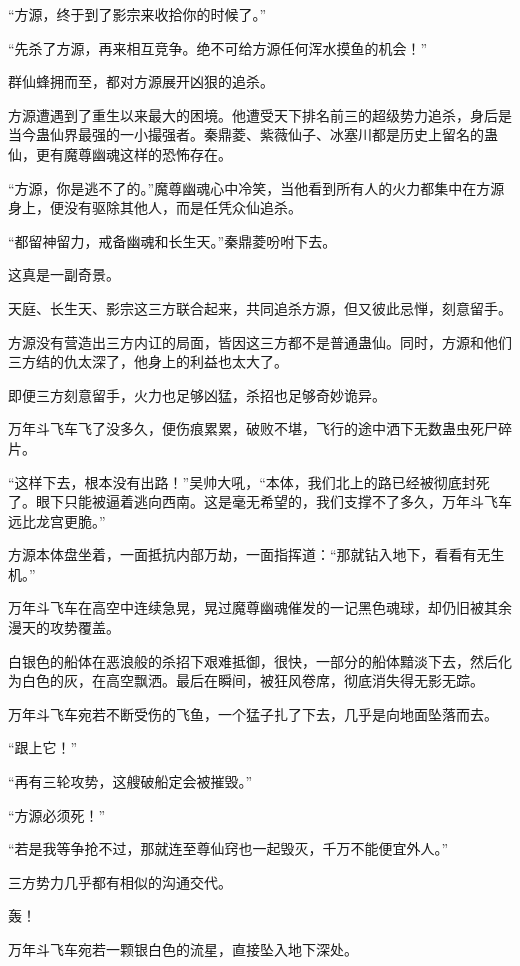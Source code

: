 \begin{this_body}
“方源，终于到了影宗来收拾你的时候了。”

“先杀了方源，再来相互竞争。绝不可给方源任何浑水摸鱼的机会！”

群仙蜂拥而至，都对方源展开凶狠的追杀。

方源遭遇到了重生以来最大的困境。他遭受天下排名前三的超级势力追杀，身后是当今蛊仙界最强的一小撮强者。秦鼎菱、紫薇仙子、冰塞川都是历史上留名的蛊仙，更有魔尊幽魂这样的恐怖存在。

“方源，你是逃不了的。”魔尊幽魂心中冷笑，当他看到所有人的火力都集中在方源身上，便没有驱除其他人，而是任凭众仙追杀。

“都留神留力，戒备幽魂和长生天。”秦鼎菱吩咐下去。

这真是一副奇景。

天庭、长生天、影宗这三方联合起来，共同追杀方源，但又彼此忌惮，刻意留手。

方源没有营造出三方内讧的局面，皆因这三方都不是普通蛊仙。同时，方源和他们三方结的仇太深了，他身上的利益也太大了。

即便三方刻意留手，火力也足够凶猛，杀招也足够奇妙诡异。

万年斗飞车飞了没多久，便伤痕累累，破败不堪，飞行的途中洒下无数蛊虫死尸碎片。

“这样下去，根本没有出路！”吴帅大吼，“本体，我们北上的路已经被彻底封死了。眼下只能被逼着逃向西南。这是毫无希望的，我们支撑不了多久，万年斗飞车远比龙宫更脆。”

方源本体盘坐着，一面抵抗内部万劫，一面指挥道：“那就钻入地下，看看有无生机。”

万年斗飞车在高空中连续急晃，晃过魔尊幽魂催发的一记黑色魂球，却仍旧被其余漫天的攻势覆盖。

白银色的船体在恶浪般的杀招下艰难抵御，很快，一部分的船体黯淡下去，然后化为白色的灰，在高空飘洒。最后在瞬间，被狂风卷席，彻底消失得无影无踪。

万年斗飞车宛若不断受伤的飞鱼，一个猛子扎了下去，几乎是向地面坠落而去。

“跟上它！”

“再有三轮攻势，这艘破船定会被摧毁。”

“方源必须死！”

“若是我等争抢不过，那就连至尊仙窍也一起毁灭，千万不能便宜外人。”

三方势力几乎都有相似的沟通交代。

轰！

万年斗飞车宛若一颗银白色的流星，直接坠入地下深处。


\end{this_body}
